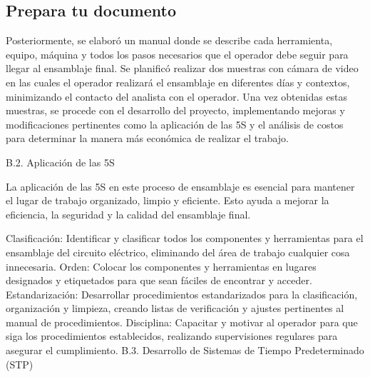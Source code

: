     
    \subsection{Prepara tu documento}
    
    Posteriormente, se elaboró un manual donde se describe cada herramienta, equipo, máquina y todos los pasos necesarios que el operador debe seguir para llegar al ensamblaje final. Se planificó realizar dos muestras con cámara de video en las cuales el operador realizará el ensamblaje en diferentes días y contextos, minimizando el contacto del analista con el operador. Una vez obtenidas estas muestras, se procede con el desarrollo del proyecto, implementando mejoras y modificaciones pertinentes como la aplicación de las 5S y el análisis de costos para determinar la manera más económica de realizar el trabajo.
    
    
    
    B.2. Aplicación de las 5S
    
    La aplicación de las 5S en este proceso de ensamblaje es esencial para mantener el lugar de trabajo organizado, limpio y eficiente. Esto ayuda a mejorar la eficiencia, la seguridad y la calidad del ensamblaje final.
    
    Clasificación: Identificar y clasificar todos los componentes y herramientas para el ensamblaje del circuito eléctrico, eliminando del área de trabajo cualquier cosa innecesaria.
    Orden: Colocar los componentes y herramientas en lugares designados y etiquetados para que sean fáciles de encontrar y acceder.
    Estandarización: Desarrollar procedimientos estandarizados para la clasificación, organización y limpieza, creando listas de verificación y ajustes pertinentes al manual de procedimientos.
    Disciplina: Capacitar y motivar al operador para que siga los procedimientos establecidos, realizando supervisiones regulares para asegurar el cumplimiento.
    B.3. Desarrollo de Sistemas de Tiempo Predeterminado (STP)
    
